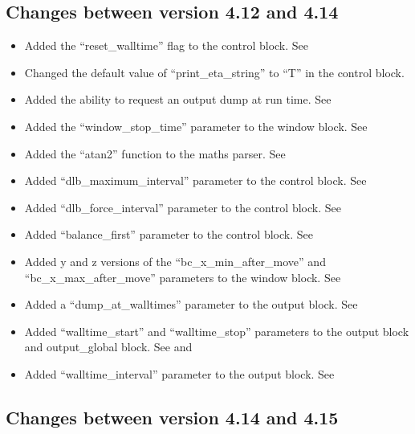 \subsection{Changes between version 4.12 and 4.14}

\begin{itemize}
\item Added the ``reset\_walltime'' flag to the control block.
    See 
\item Changed the default value of ``print\_eta\_string'' to ``T'' in the
    control block.
\item Added the ability to request an output dump at run time.
    See 
\item Added the ``window\_stop\_time'' parameter to the window block.
    See 
\item Added the ``atan2'' function to the maths parser.
    See 
\item Added ``dlb\_maximum\_interval'' parameter to the control block.
    See 
\item Added ``dlb\_force\_interval'' parameter to the control block.
    See 
\item Added ``balance\_first'' parameter to the control block.
    See 
\item Added y and z versions of the ``bc\_x\_min\_after\_move'' and
    ``bc\_x\_max\_after\_move'' parameters to the window block.
    See 
\item Added a ``dump\_at\_walltimes'' parameter to the output block.
    See 
\item Added ``walltime\_start'' and ``walltime\_stop'' parameters to the output
    block and output\_global block.
    See  and 
\item Added ``walltime\_interval'' parameter to the output block.
    See 
\end{itemize}
\bigskip


\subsection{Changes between version 4.14 and 4.15}


